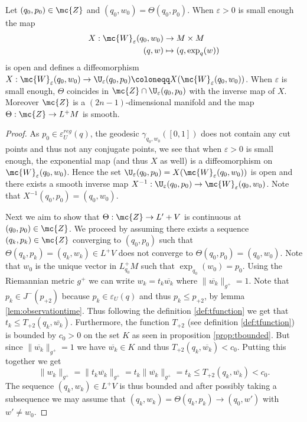 \begin{lemma}
Let $(q_0,p_0)\in \mc{Z}$ and $(q_0,w_0)=\Theta(q_0,p_0)$. When $\varepsilon>0$ is small enough the map 
\begin{align*}
    X:\mc{W}_\varepsilon(q_0,w_0) &\to M\times M\\
    (q,w) &\mapsto (q,\exp_q(w))
\end{align*}
is open and defines a diffeomorphism $X:\mc{W}_\varepsilon(q_0,w_0)\to \U_\varepsilon(q_0,p_0) \coloneqq X(\mc{W}_\varepsilon(q_0,w_0))$. When $\varepsilon$ is small enough, $\Theta$ coincides in $\mc{Z}\cap \U_\varepsilon(q_0,p_0)$ with the inverse map of $X$. Moreover $\mc{Z}$ is a $(2n-1)$-dimensional manifold and the map $\Theta:\mc{Z}\to L^+M$ is smooth.
\end{lemma}
\begin{proof}
As $p_0\in \varepsilon^{reg}_U(q)$, the geodesic $\gamma_{q_0,w_0}([0,1])$ does not contain any cut points and thus not any conjugate points, we see that when $\varepsilon>0$ is small enough, the exponential map (and thus $X$ as well) is a diffeomorphism on $\mc{W}_\varepsilon(q_0,w_0)$. Hence the set $\U_\varepsilon(q_0,p_0) = X(\mc{W}_\varepsilon(q_0,w_0))$ is open and there exists a smooth inverse map $X^{-1}:\U_\varepsilon(q_0,p_0)\to\mc{W}_\varepsilon(q_0,w_0)$. Note that $X^{-1}(q_0,p_0) = (q_0,w_0)$.

Next we aim to show that $\Theta:\mc{Z}\to L'+V$ is continuous at $(q_0,p_0)\in \mc{Z}$. We proceed by assuming there exists a sequence $(q_k,p_k)\in \mc{Z}$ converging to $(q_0,p_0)$ such that $\Theta(q_k,p_k)=(q_k,w_k)\in L^+V$ does not converge to $\Theta(q_0,p_0)=(q_0,w_0)$. 
Note that $w_0$ is the unique vector in $L^+_{q_0}M$ such that $\exp_{q_0}(w_0)=p_0$. Using the Riemannian metric $g^+$ we can write $w_k = t_k \overline{w_k}$ where $\lVert \overline{w_k} \rVert_{g^+}=1$.
Note that $p_k\in J^-(p_{+2})$ because $p_k\in \varepsilon_U(q)$ and thus $p_k\leq p_{+2}$, by lemma \ref{lem:observationtime}. Thus following the definition \ref{def:tfunction} we get that $t_k \leq T_{+2}(q_k,\overline{w_k})$.
Furthermore, the function $T_{+2}$ (see definition \ref{def:tfunction}) is bounded by $c_0>0$ on the set $K$ as seen in proposition \ref{prop:tbounded}. But since $\lVert \overline{w_k} \rVert_{g^+}=1$ we have $\overline{w_k}\in K$ and thus $T_{+2}(q_k,\overline{w_k})<c_0$. Putting this together we get
\[
    \lVert w_k \rVert_{g^+}=\lVert t_k \overline{w_k} \rVert_{g^+} = t_k\lVert \overline{w_k} \rVert_{g^+} = t_k \leq T_{+2}(q_k,\overline{w_k})<c_0.
\]
The sequence $(q_k,w_k)\in L^+V$ is thus bounded and after possibly taking a subsequence we may assume that $(q_k,w_k)=\Theta(q_k,p_k)\to (q_0,w')$ with $w'\neq w_0$.


\end{proof}
